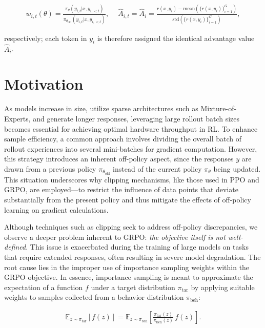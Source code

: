 \begin{align}
    w_{i,t}(\theta)=\frac{ \pi_{\theta} (y_{i,t} | x, y_{i,<t}) }{ \pi_{\theta_\text{old}} (y_{i,t} | x,y_{i,<t})},\quad\ 
    \widehat{A}_{i,t} = \widehat{A}_{i} = \frac{r(x, y_i) - \mathrm{mean} \left( \{ r(x, y_i) \}_{i=1}^G \right) }{ \mathrm{std} \left( \{ r(x, y_i) \}_{i=1}^G \right) },
\end{align}

respectively; each token in $y_i$ is therefore assigned the identical advantage value $\widehat{A}_{i}$.

\section{Motivation}
\label{sec:motivation}

As models increase in size, utilize sparse architectures such as Mixture-of-Experts, and generate longer responses, leveraging large rollout batch sizes becomes essential for achieving optimal hardware throughput in RL. To enhance sample efficiency, a common approach involves dividing the overall batch of rollout experiences into several mini-batches for gradient computation. However, this strategy introduces an inherent off-policy aspect, since the responses $y$ are drawn from a previous policy $\pi_{\theta_\text{old}}$ instead of the current policy $\pi_\theta$ being updated. This situation underscores why clipping mechanisms, like those used in PPO and GRPO, are employed—to restrict the influence of data points that deviate substantially from the present policy and thus mitigate the effects of off-policy learning on gradient calculations.

Although techniques such as clipping seek to address off-policy discrepancies, we observe a deeper problem inherent to GRPO: \textit{the objective itself is not well-defined}. This issue is exacerbated during the training of large models on tasks that require extended responses, often resulting in severe model degradation. The root cause lies in the improper use of importance sampling weights within the GRPO objective. In essence, importance sampling is meant to approximate the expectation of a function $f$ under a target distribution $\pi_\text{tar}$ by applying suitable weights to samples collected from a behavior distribution $\pi_\text{beh}$:

\begin{align}
\mathbb{E}_{z \sim \pi_\text{tar}} \left[ f(z) \right] = \mathbb{E}_{z \sim \pi_\text{beh}} \left[ \frac{ \pi_\text{tar} (z) }{ \pi_\text{beh} (z)} \, f(z) \right].
\end{align}

